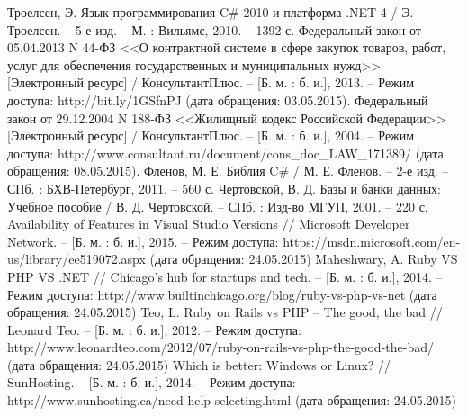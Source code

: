 \begin{thebibliography}{99}
	 Троелсен, Э. Язык программирования C\# 2010 и платформа .NET 4 / Э. Троелсен. – 5-е изд. – М. : Вильямс, 2010. – 1392 с.
	 Федеральный закон от 05.04.2013 N 44-ФЗ <<О контрактной системе в сфере закупок товаров, работ, услуг для обеспечения государственных и муниципальных нужд>> [Электронный ресурс] / КонсультантПлюс. – [Б. м. : б. и.], 2013. – Режим доступа: http://bit.ly/1GSfnPJ (дата обращения: 03.05.2015).
	 Федеральный закон от 29.12.2004 N 188-ФЗ <<Жилищный кодекс Российской Федерации>> [Электронный ресурс] / КонсультантПлюс. – [Б. м. : б. и.], 2004. – Режим доступа: http://www.consultant.ru/document/cons\_doc\_LAW\_171389/ (дата обращения: 08.05.2015).
	 Фленов, М. Е. Библия C\# / М. Е. Фленов. – 2-е изд. – СПб. : БХВ-Петербург, 2011. – 560 с.
	 Чертовской, В. Д. Базы и банки данных: Учебное пособие / В. Д. Чертовской. – СПб. : Изд-во МГУП, 2001. –  220 с.
	 Availability of Features in Visual Studio Versions // Microsoft Developer Network. – [Б. м. : б. и.], 2015. – Режим доступа: https://msdn.microsoft.com/en-us/library/ee519072.aspx (дата обращения: 24.05.2015)
	 Maheshwary, A. Ruby VS PHP VS .NET // Chicago's hub for startups and tech. – [Б. м. : б. и.], 2014. – Режим доступа: http://www.builtinchicago.org/blog/ruby-vs-php-vs-net (дата обращения: 24.05.2015)
	 Teo, L. Ruby on Rails vs PHP – The good, the bad // Leonard Teo. – [Б. м. : б. и.], 2012. – Режим доступа: http://www.leonardteo.com/2012/07/ruby-on-rails-vs-php-the-good-the-bad/ (дата обращения: 24.05.2015)
	 Which is better: Windows or Linux? // SunHosting. – [Б. м. : б. и.], 2014. – Режим доступа: http://www.sunhosting.ca/need-help-selecting.html (дата обращения: 24.05.2015)
\end{thebibliography}


\clearpage
\newpage